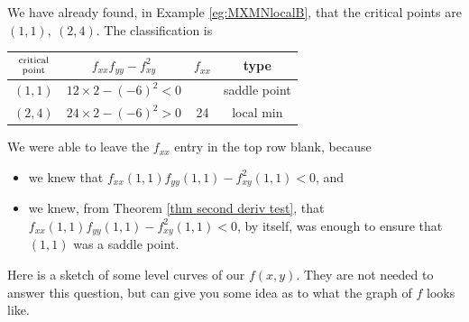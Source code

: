 \begin{eg}[$f(x,y)=2x^3 - 6xy + y^2 +4y $]
We have already found, in Example \ref{eg:MXMNlocalB}, 
that the critical points are $(1,1),\ (2,4)$. The classification is
\begin{center}
\renewcommand{\arraystretch}{1.3}
     \begin{tabular}{|c|c|c|c|}
     \hline
    $\Atop{\text{critical}}{\text{point}}$  & $f_{xx}f_{yy}-f_{xy}^2$ & 
                                                          $f_{xx}$ & type \\    
    \hline
     $(1,1)$  & $12\times 2-(-6)^2<0$ &    & saddle point  \\ \hline
     $(2,4)$  & $24\times 2-(-6)^2>0$ & 24 & local min \\  \hline
     \end{tabular}
\renewcommand{\arraystretch}{1.0}
\end{center}
We were able to leave the $f_{xx}$ entry in the top row blank, because
\begin{itemize}\itemsep1pt \parskip0pt 
\item
we knew that $f_{xx}(1,1) f_{yy}(1,1)-f_{xy}^2(1,1)<0$, and 
\item
we knew, from Theorem \ref{thm second deriv test}, 
that $f_{xx}(1,1) f_{yy}(1,1)-f_{xy}^2(1,1)<0$, by itself,
was enough to ensure that $(1,1)$ was a saddle point.
\end{itemize}
Here is a sketch of some level curves of our $f(x,y)$.
They are not needed to answer this question, but can give you
some idea as to what the graph of $f$ looks like.
\end{eg}


